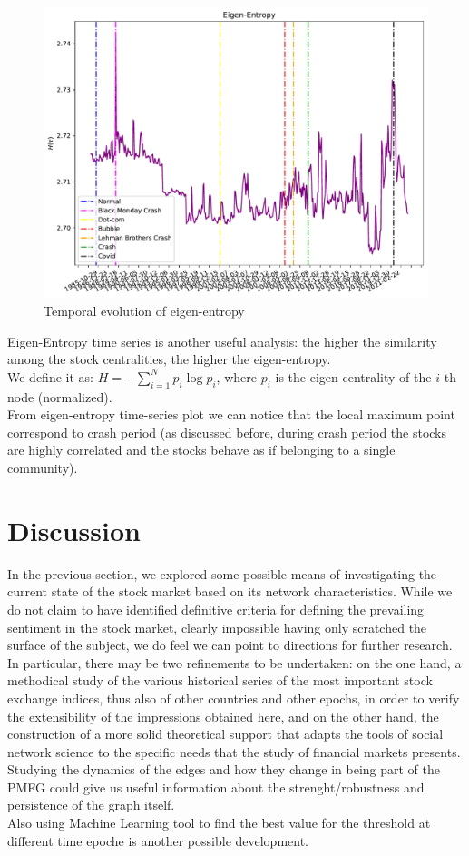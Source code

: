 \documentclass[sigchi]{acmart}
\begin{document}
\begin{figure}[H]
	\centering
	\includegraphics[width=\linewidth]{eigen_entropy_no_trashold.pdf}
	\caption{Temporal evolution of eigen-entropy}
\end{figure}
Eigen-Entropy time series is another useful analysis: the higher the similarity among the stock centralities, the higher the eigen-entropy.\\
We define it as:  $H = - \sum_{i=1}^{N} p_i \log p_i$, where $p_i$ is the eigen-centrality of the $i$-th node (normalized).\\
From eigen-entropy time-series plot we can notice that the local maximum point correspond to crash period (as discussed before, during crash period the stocks are highly correlated and the stocks behave as if belonging to a single community).
\section{Discussion}
In the previous section, we explored some possible means of investigating the current state of the stock market based on its network characteristics. While we do not claim to have identified definitive criteria for defining the prevailing sentiment in the stock market, clearly impossible having only scratched the surface of the subject, we do feel we can point to directions for further research. In particular, there may be two refinements to be undertaken: on the one hand, a methodical study of the various historical series of the most important stock exchange indices, thus also of other countries and other epochs, in order to verify the extensibility of the impressions obtained here, and on the other hand, the construction of a more solid theoretical support that adapts the tools of social network science to the specific needs that the study of financial markets presents.\\
Studying the dynamics of the edges and how they change in being part of  the PMFG could give us useful information about the strenght/robustness and persistence of the graph itself.\\
Also using Machine Learning tool to find the best value for the threshold at different time epoche is another possible development.


\end{document}

